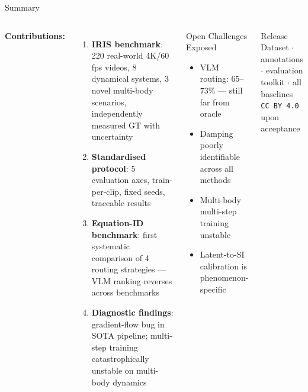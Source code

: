 \documentclass[aspectratio=169,12pt]{beamer}
\newcommand{\highlight}[1]{\textcolor{irisblue}{\textbf{#1}}}
\begin{document}
\begin{frame}{Summary}
  \begin{columns}[T]
      \textbf{Contributions:}
      \begin{enumerate}\setlength\itemsep{0.5em}
        \item \highlight{IRIS benchmark}: 220 real-world 4K/60\,fps videos, 8 dynamical systems, 3 novel multi-body scenarios, independently measured GT with uncertainty

        \item \highlight{Standardised protocol}: 5 evaluation axes, train-per-clip, fixed seeds, traceable results

        \item \highlight{Equation-ID benchmark}: first systematic comparison of 4 routing strategies — VLM ranking reverses across benchmarks

        \item \highlight{Diagnostic findings}: gradient-flow bug in SOTA pipeline; multi-step training catastrophically unstable on multi-body dynamics
      \end{enumerate}

      \begin{block}{Open Challenges Exposed}
        \begin{itemize}\setlength\itemsep{0.35em}
          \item VLM routing: 65--73\% — still far from oracle
          \item Damping poorly identifiable across all methods
          \item Multi-body multi-step training unstable
          \item Latent-to-SI calibration is phenomenon-specific
        \end{itemize}
      \end{block}
      \vspace{0.5em}
      \begin{block}{Release}
        Dataset $\cdot$ annotations $\cdot$ evaluation toolkit $\cdot$ all baselines\\
        \texttt{CC BY 4.0} upon acceptance
      \end{block}
  \end{columns}
\end{frame}
\end{document}
